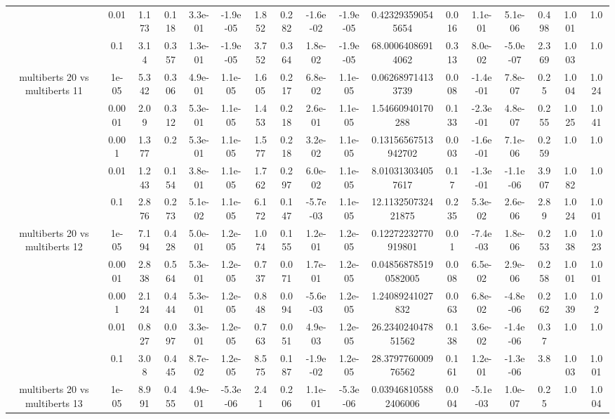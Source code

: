 \begin{tabular}{|c|c|c|c|c|c|c|c|c|c|c|c|c|c|c|c|c|}
 & 0.01 & 1.173 & 0.118 & 3.3e-01 & -1.9e-05 & 1.852 & 0.282 & -1.6e-02 & -1.9e-05 & 0.423293590545654 & 0.016 & 1.1e-01 & 5.1e-06 & 0.498 & 1.001 & 1.0 \\
 & 0.1 & 3.14 & 0.357 & 1.3e-01 & -1.9e-05 & 3.752 & 0.364 & 1.8e-02 & -1.9e-05 & 68.00064086914062 & 0.313 & 8.0e-02 & -5.0e-07 & 2.369 & 1.003 & 1.0 \\
\hline
\multirow{5}{*}{multiberts 20 vs multiberts 11} & 1e-05 & 5.342 & 0.306 & 4.9e-01 & 1.1e-05 & 1.605 & 0.217 & 6.8e-02 & 1.1e-05 & 0.062689714133739 & 0.008 & -1.4e-01 & 7.8e-07 & 0.25 & 1.004 & 1.024 \\
 & 0.0001 & 2.09 & 0.312 & 5.3e-01 & 1.1e-05 & 1.453 & 0.218 & 2.6e-01 & 1.1e-05 & 1.54660940170288 & 0.133 & -2.3e-01 & 4.8e-07 & 0.255 & 1.025 & 1.041 \\
 & 0.001 & 1.377 & 0.2 & 5.3e-01 & 1.1e-05 & 1.577 & 0.218 & 3.2e-02 & 1.1e-05 & 0.13156567513942702 & 0.003 & -1.6e-01 & 7.1e-06 & 0.259 & 1.0 & 1.0 \\
 & 0.01 & 1.243 & 0.154 & 3.8e-01 & 1.1e-05 & 1.762 & 0.297 & 6.0e-02 & 1.1e-05 & 8.010313034057617 & 0.17 & -1.3e-01 & -1.1e-06 & 3.907 & 1.082 & 1.0 \\
 & 0.1 & 2.876 & 0.273 & 5.1e-02 & 1.1e-05 & 6.172 & 0.147 & -5.7e-03 & 1.1e-05 & 12.113250732421875 & 0.235 & 5.3e-02 & 2.6e-06 & 2.89 & 1.024 & 1.001 \\
\hline
\multirow{5}{*}{multiberts 20 vs multiberts 12} & 1e-05 & 7.194 & 0.428 & 5.0e-01 & 1.2e-05 & 1.074 & 0.155 & 1.2e-01 & 1.2e-05 & 0.12272232770919801 & 0.01 & -7.4e-03 & 1.8e-06 & 0.253 & 1.038 & 1.023 \\
 & 0.0001 & 2.838 & 0.564 & 5.3e-01 & 1.2e-05 & 0.737 & 0.071 & 1.7e-01 & 1.2e-05 & 0.048568785190582005 & 0.008 & 6.5e-02 & 2.9e-06 & 0.258 & 1.001 & 1.001 \\
 & 0.001 & 2.124 & 0.444 & 5.3e-01 & 1.2e-05 & 0.848 & 0.094 & -5.6e-03 & 1.2e-05 & 1.24089241027832 & 0.063 & 6.8e-02 & -4.8e-06 & 0.262 & 1.039 & 1.02 \\
 & 0.01 & 0.827 & 0.097 & 3.3e-01 & 1.2e-05 & 0.763 & 0.051 & 4.9e-03 & 1.2e-05 & 26.234024047851562 & 0.138 & 3.6e-02 & -1.4e-06 & 0.37 & 1.0 & 1.0 \\
 & 0.1 & 3.08 & 0.445 & 8.7e-02 & 1.2e-05 & 8.575 & 0.187 & -1.9e-02 & 1.2e-05 & 28.379776000976562 & 0.161 & 1.2e-01 & -1.3e-06 & 3.8 & 1.003 & 1.001 \\
\hline
\multirow{5}{*}{multiberts 20 vs multiberts 13} & 1e-05 & 8.991 & 0.455 & 4.9e-01 & -5.3e-06 & 2.41 & 0.206 & 1.1e-01 & -5.3e-06 & 0.039468105882406006 & 0.004 & -5.1e-03 & 1.0e-07 & 0.25 & 1.0 & 1.004 \\

\end{tabular}
